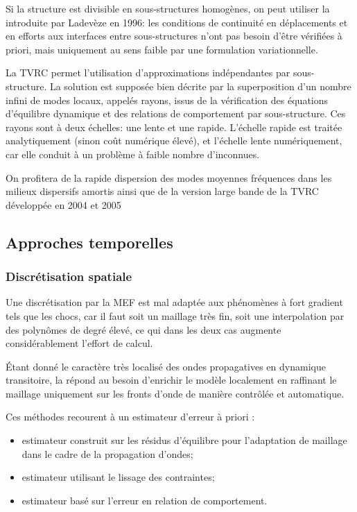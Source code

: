 Si la structure est divisible en sous-structures homogènes, on peut utiliser la  introduite
par Ladevèze en 1996:
les conditions de continuité en déplacements et en efforts aux interfaces entre
sous-structures n'ont pas besoin d'être vérifiées à priori, mais uniquement au sens faible par une
formulation variationnelle.

La TVRC permet l'utilisation d'approximations indépendantes par sous-structure.
La solution est supposée bien décrite par la superposition d'un nombre infini de modes locaux, appelés rayons, issus de la vérification des équations d'équilibre dynamique et des relations de comportement par sous-structure. Ces rayons sont à deux échelles: une lente et une rapide. L'échelle rapide est traitée analytiquement (sinon coût numérique élevé), et l'échelle lente numériquement, car elle conduit à un problème à faible nombre d'inconnues.

On profitera de la rapide dispersion des modes moyennes fréquences dans les milieux dispersifs amortis ainsi que de la version large bande de la TVRC développée en 2004 et 2005~\cite{Lit-Chevreuil}

\medskip
\subsection{Approches temporelles}

\subsubsection{Discrétisation spatiale}
Une discrétisation par la MEF est mal adaptée aux phénomènes à fort gradient tels
que les chocs, car il faut soit un maillage très fin, soit une interpolation par des polynômes
de degré élevé, ce qui dans les deux cas augmente considérablement l'effort de calcul.

Étant donné le caractère très localisé des ondes propagatives en dynamique transitoire,
la  répond au besoin d'enrichir le modèle
localement en raffinant le maillage uniquement sur les fronts d'onde de manière contrôlée et
automatique.

Ces méthodes recourent à un estimateur d'erreur à priori :
\begin{itemize}
	\item estimateur construit sur les résidus d'équilibre pour l'adaptation de
		maillage dans le cadre de la propagation d'ondes;
	\item estimateur utilisant le lissage des contraintes;
	\item estimateur basé sur l'erreur en relation de comportement.
\end{itemize}

